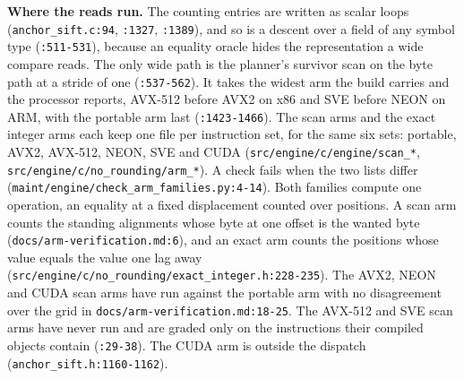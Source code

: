 \noindent\textbf{Where the reads run.} The counting entries are written as scalar loops (\texttt{anchor\_sift.c:94}, \texttt{:1327}, \texttt{:1389}), and so is a descent over a field of any symbol type (\texttt{:511-531}), because an equality oracle hides the representation a wide compare reads. The only wide path is the planner's survivor scan on the byte path at a stride of one (\texttt{:537-562}). It takes the widest arm the build carries and the processor reports, AVX-512 before AVX2 on x86 and SVE before NEON on ARM, with the portable arm last (\texttt{:1423-1466}). The scan arms and the exact integer arms each keep one file per instruction set, for the same six sets: portable, AVX2, AVX-512, NEON, SVE and CUDA (\texttt{src/\allowbreak{}engine/\allowbreak{}c/\allowbreak{}engine/\allowbreak{}scan\_*}, \texttt{src/\allowbreak{}engine/\allowbreak{}c/\allowbreak{}no\_rounding/\allowbreak{}arm\_*}). A check fails when the two lists differ (\texttt{maint/\allowbreak{}engine/\allowbreak{}check\_arm\_families.py:4-14}). Both families compute one operation, an equality at a fixed displacement counted over positions. A scan arm counts the standing alignments whose byte at one offset is the wanted byte (\texttt{docs/\allowbreak{}arm-\allowbreak{}verification.md:6}), and an exact arm counts the positions whose value equals the value one lag away (\texttt{src/\allowbreak{}engine/\allowbreak{}c/\allowbreak{}no\_rounding/\allowbreak{}exact\_integer.h:228-\allowbreak{}235}). The AVX2, NEON and CUDA scan arms have run against the portable arm with no disagreement over the grid in \texttt{docs/\allowbreak{}arm-\allowbreak{}verification.md:18-\allowbreak{}25}. The AVX-512 and SVE scan arms have never run and are graded only on the instructions their compiled objects contain (\texttt{:29-38}). The CUDA arm is outside the dispatch (\texttt{anchor\_sift.h:1160-1162}).

